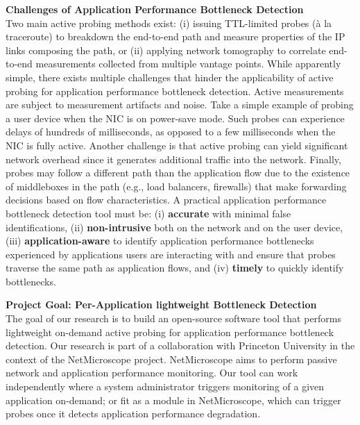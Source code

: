 \documentclass[11 pt]{article}
\begin{document}
\noindent \textbf{Challenges of Application Performance Bottleneck Detection}\\

Two main active probing methods exist: (i) issuing TTL-limited probes (\`{a} la traceroute) to breakdown the end-to-end path and measure properties of the IP links composing the path, or (ii) applying network tomography to correlate end-to-end measurements collected from multiple vantage points. While apparently simple, there exists multiple challenges that hinder the applicability of active probing for application performance bottleneck detection. Active measurements are subject to measurement artifacts and noise. Take a simple example of probing a user device when the NIC is on power-save mode. Such probes can experience delays of hundreds of milliseconds, as opposed to a few milliseconds when the NIC is fully active. Another challenge is that active probing can yield significant network overhead since it generates additional traffic into the network. Finally, probes may follow a different path than the application flow due to the existence of middleboxes in the path (e.g., load balancers, firewalls) that make forwarding decisions based on flow characteristics. A practical application performance bottleneck detection tool must be: (i) \textbf{accurate} with minimal false identifications, (ii) \textbf{non-intrusive} both on the network and on the user device, (iii) \textbf{application-aware} to identify application performance bottlenecks experienced by applications users are interacting with and ensure that probes traverse the same path as application flows, and (iv) \textbf{timely} to quickly identify bottlenecks.\\
\newpage

\noindent \textbf{Project Goal: Per-Application lightweight Bottleneck Detection}\\

The goal of our research is to build an open-source software tool that performs lightweight on-demand active probing for application performance bottleneck detection. Our research is part of a collaboration with Princeton University in the context of the NetMicroscope project. NetMicroscope aims to perform passive network and application performance monitoring. Our tool can work independently where a system administrator triggers monitoring of a given application on-demand; or fit as a module in NetMicroscope, which can trigger probes once it detects application performance degradation.\\
\end{document}

